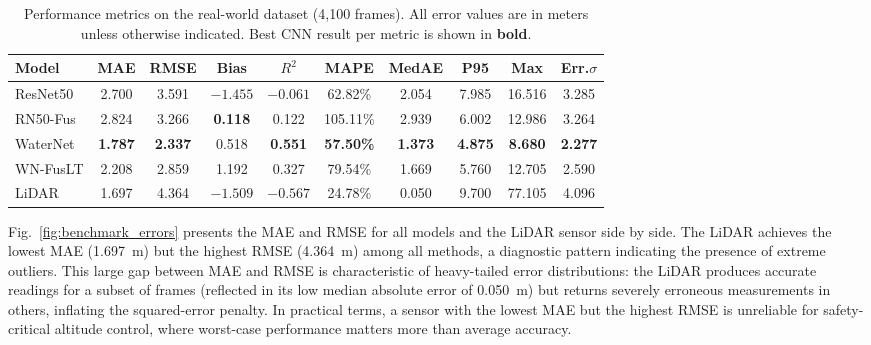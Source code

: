 \begin{table}[htbp]
    \caption{Performance metrics on the real-world dataset (4{,}100 frames). All error values are in meters unless otherwise indicated. Best CNN result per metric is shown in \textbf{bold}.}
    \begin{center}
        \small
        \begin{tabular}{|l|c|c|c|c|c|c|c|c|c|}
        \hline
        \textbf{Model}
            & \textbf{MAE}
            & \textbf{RMSE}
            & \textbf{Bias}
            & \textbf{$R^2$}
            & \textbf{MAPE}
            & \textbf{MedAE}
            & \textbf{P95}
            & \textbf{Max}
            & \textbf{Err.$\sigma$} \\
        \hline
        ResNet50
            & 2.700
            & 3.591
            & $-1.455$
            & $-0.061$
            & 62.82\%
            & 2.054
            & 7.985
            & 16.516
            & 3.285 \\
        \hline
        RN50-Fus
            & 2.824
            & 3.266
            & \textbf{0.118}
            & 0.122
            & 105.11\%
            & 2.939
            & 6.002
            & 12.986
            & 3.264 \\
        \hline
        WaterNet
            & \textbf{1.787}
            & \textbf{2.337}
            & 0.518
            & \textbf{0.551}
            & \textbf{57.50\%}
            & \textbf{1.373}
            & \textbf{4.875}
            & \textbf{8.680}
            & \textbf{2.277} \\
        \hline
        WN-FusLT
            & 2.208
            & 2.859
            & 1.192
            & 0.327
            & 79.54\%
            & 1.669
            & 5.760
            & 12.705
            & 2.590 \\
        \hline
        LiDAR
            & 1.697
            & 4.364
            & $-1.509$
            & $-0.567$
            & 24.78\%
            & 0.050
            & 9.700
            & 77.105
            & 4.096 \\
        \hline
        \end{tabular}
    \label{tab:real_metrics}
    \end{center}
\end{table}

Fig.~\ref{fig:benchmark_errors} presents the MAE and RMSE for all models and the LiDAR sensor side by side. The LiDAR achieves the lowest MAE (1.697~m) but the highest RMSE (4.364~m) among all methods, a diagnostic pattern indicating the presence of extreme outliers. This large gap between MAE and RMSE is characteristic of heavy-tailed error distributions: the LiDAR produces accurate readings for a subset of frames (reflected in its low median absolute error of 0.050~m) but returns severely erroneous measurements in others, inflating the squared-error penalty. In practical terms, a sensor with the lowest MAE but the highest RMSE is unreliable for safety-critical altitude control, where worst-case performance matters more than average accuracy.

